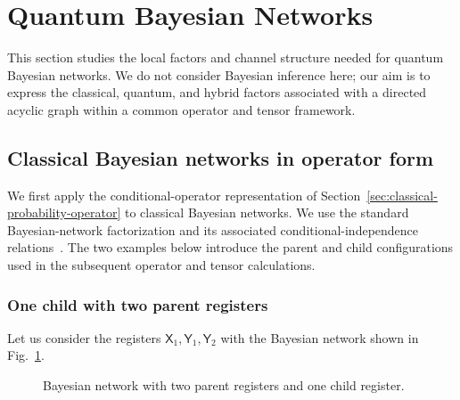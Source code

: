 \documentclass[
    aps,
    pra,
    reprint,
    superscriptaddress,
    nofootinbib
]{revtex4-2}
\theoremstyle{definition}
\theoremstyle{plain}
\begin{document}
\section{Quantum Bayesian Networks}
\label{sec:quantum-bayesian-networks}

This section studies the local factors and channel structure needed for
quantum Bayesian networks. We do not consider Bayesian inference here; our
aim is to express the classical, quantum, and hybrid factors associated with
a directed acyclic graph within a common operator and tensor framework.

\subsection{Classical Bayesian networks in operator form}

We first apply the conditional-operator representation of
Section~\ref{sec:classical-probability-operator} to classical Bayesian
networks. We use the standard Bayesian-network
factorization and its associated conditional-independence
relations~\cite[Sec.~11.2.3, Eq.~(11.3)]{Darwiche2008}. The two examples
below introduce the parent and child configurations used in the subsequent
operator and tensor calculations.

\subsubsection{One child with two parent registers}

Let us consider the registers
$\mathsf{X}_{1},\mathsf{Y}_{1},\mathsf{Y}_{2}$ with the Bayesian network
shown in Fig.~\ref{fig:bn}.

\begin{figure}[ht]
    \centering
    \caption{Bayesian network with two parent registers and one child
    register.}
    \label{fig:bn}
    \end{figure}
\end{document}
